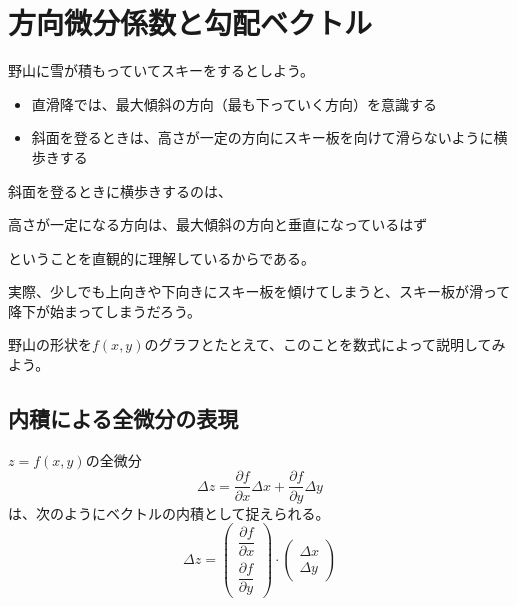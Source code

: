 \documentclass[../../../topic_calculus]{subfiles}
\begin{document}
\sectionline
\section{方向微分係数と勾配ベクトル}

野山に雪が積もっていてスキーをするとしよう。

\begin{itemize}
  \item 直滑降では、最大傾斜の方向（最も下っていく方向）を意識する
  \item 斜面を登るときは、高さが一定の方向にスキー板を向けて滑らないように横歩きする
\end{itemize}

斜面を登るときに横歩きするのは、
\begin{emphabox}
  \begin{spacebox}
    \begin{center}
      高さが一定になる方向は、最大傾斜の方向と垂直になっているはず
    \end{center}
  \end{spacebox}
\end{emphabox}
ということを直観的に理解しているからである。

実際、少しでも上向きや下向きにスキー板を傾けてしまうと、スキー板が滑って降下が始まってしまうだろう。

\br

野山の形状を$f(x,y)$のグラフとたとえて、このことを数式によって説明してみよう。

\subsection{内積による全微分の表現}

$z=f(x,y)$の全微分
\begin{equation*}
  \Delta z = \frac{\partial f}{\partial x}\Delta x + \frac{\partial f}{\partial y}\Delta y
\end{equation*}
は、次のようにベクトルの内積として捉えられる。
\begin{equation*}
  \Delta z = \begin{pmatrix} \dfrac{\partial f}{\partial x} \\ \dfrac{\partial f}{\partial y} \end{pmatrix} \cdot \begin{pmatrix} \Delta x \\ \Delta y \end{pmatrix}
\end{equation*}
\end{document}

